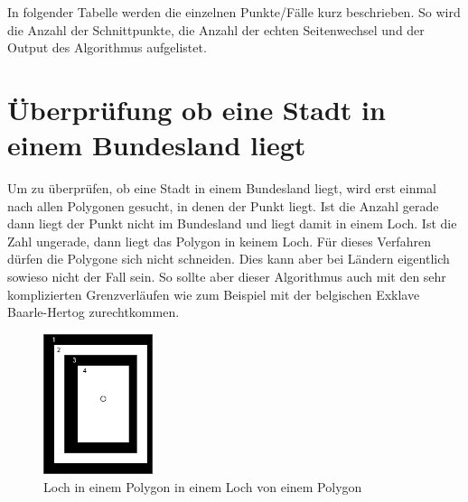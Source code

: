 \documentclass[conference]{IEEEtran}
\begin{document}
	In folgender Tabelle werden die einzelnen Punkte/Fälle kurz beschrieben. So wird die Anzahl der Schnittpunkte, die Anzahl der echten Seitenwechsel und der Output des Algorithmus aufgelistet.\\
	\section{Überprüfung ob eine Stadt in einem Bundesland liegt}
	Um zu überprüfen, ob eine Stadt in einem Bundesland liegt, wird erst einmal nach allen Polygonen gesucht, in denen der Punkt liegt. Ist die Anzahl gerade dann liegt der Punkt nicht im Bundesland und liegt damit in einem Loch. Ist die Zahl ungerade, dann liegt das Polygon in keinem Loch. Für dieses Verfahren dürfen die Polygone sich nicht schneiden. Dies kann aber bei Ländern eigentlich sowieso nicht der Fall sein. So sollte aber dieser Algorithmus auch mit den sehr komplizierten Grenzverläufen wie zum Beispiel mit der belgischen Exklave Baarle-Hertog zurechtkommen.
	\begin{figure}[h]
		\begin{center}
			\includegraphics[width=3.2cm]{StadtInBundesland.png}
			\caption{Loch in einem Polygon in einem Loch von einem Polygon}
			\label{	StadtInBundesland}
		\end{center}
	\end{figure}\\
\end{document}
